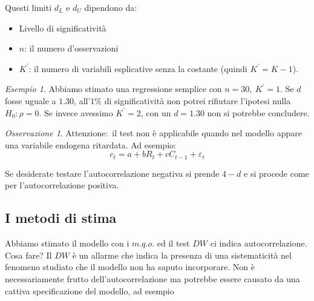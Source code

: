 \documentclass[a4paper]{report}
\newcounter{ese}
\theoremstyle{remark}
\newtheorem{esempio}[ese]{Esempio}
\newtheorem{remark}{Osservazione}
\newcounter{theor}
\begin{document}
\begin{enumerate}
Questi limiti $d_{L}$ e $d_{U}$ dipendono da:

\begin{itemize}
\item Livello di significativit\`{a}

\item $n$: il numero d'osservazioni

\item $K^{\prime }$: il numero di variabili esplicative senza la costante
(quindi $K^{\prime }=K-1$).
\end{itemize}
\end{enumerate}

\begin{esempio}
Abbiamo stimato una regressione semplice con $n=30,\ K^{\prime }=1$. Se $d$
fosse uguale a $1.30$, all'$1$\% di significativit\`{a} non potrei rifiutare
l'ipotesi nulla $H_{0}:\rho =0$. Se invece avessimo $K^{\prime }=2$, con un $%
d=1.30$ non si potrebbe concludere.
\end{esempio}

\begin{remark}
Attenzione:\ il test non \`{e} applicabile quando nel modello appare una
variabile endogena ritardata. Ad esempio:%
\begin{equation*}
c_{t}=a+bR_{t}+cC_{t-1}+\varepsilon _{t}
\end{equation*}
\end{remark}

Se desiderate testare l'autocorrelazione negativa si prende $4-d$ e si
procede come per l'autocorrelazione positiva.

\subsection{\label{autocorr i metodi di stima}I metodi di stima}

Abbiamo stimato il modello con i $m.q.o.$ ed il test $DW$ ci indica
autocorrelazione. Cosa fare? Il $DW$ \`{e} un allarme che indica la presenza
di una sistematicit\`{a} nel fenomeno studiato che il modello non ha saputo
incorporare. Non \`{e} necessariamente frutto dell'autocorrelazione ma
potrebbe essere causato da una cattiva specificazione del modello, ad esempio
\end{document}
